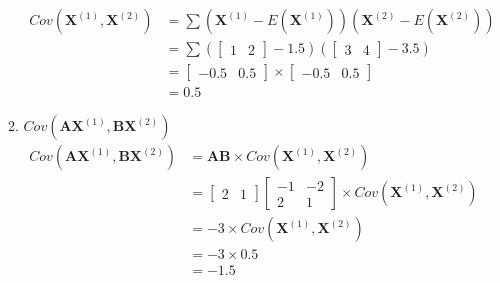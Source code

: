 \documentclass[12pt,a4paper]{paper}
\begin{document}
\begin{enumerate}
\begin{enumerate}
\begin{equation}
\begin{split}
Cov(\textbf{X}^{(1)},\textbf{X}^{(2)}) &= \sum{(\textbf{X}^{(1)} - E(\textbf{X}^{(1)}))(\textbf{X}^{(2)} - E(\textbf{X}^{(2)}))}\\
&= \sum{(\left[\begin{array}{cc}1 & 2\end{array}\right] - 1.5)(\left[\begin{array}{cc}3 & 4\end{array}\right] - 3.5)}\\
&= \left[\begin{array}{cc}-0.5 & 0.5\end{array}\right] \times \left[\begin{array}{cc}-0.5 & 0.5\end{array}\right]\\
&= 0.5
\end{split}
\end{equation}
\item $Cov(\textbf{AX}^{(1)},\textbf{BX}^{(2)})$
\begin{equation}
\begin{split}
Cov(\textbf{AX}^{(1)},\textbf{BX}^{(2)}) &= \textbf{AB} \times Cov(\textbf{X}^{(1)},\textbf{X}^{(2)})\\
&= \left[\begin{array}{cc}2 & 1\end{array}\right]\left[\begin{array}{cc}-1 & -2 \\ 2 & 1\end{array}\right]\times Cov(\textbf{X}^{(1)},\textbf{X}^{(2)})\\
&= -3 \times Cov(\textbf{X}^{(1)},\textbf{X}^{(2)})\\
&= -3 \times 0.5\\
&= -1.5
\end{split}
\end{equation}
\end{enumerate}
\end{enumerate}
\end{document}

